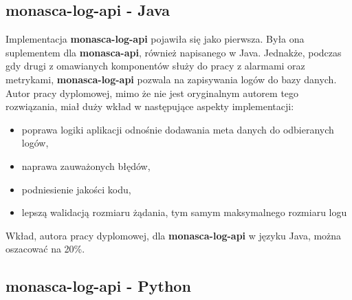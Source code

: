 \subsection{monasca-log-api - Java}
\label{chapter:application:own_work:monasca_log_api:java}
    Implementacja \textbf{monasca-log-api} pojawiła się jako pierwsza. Była ona suplementem dla \textbf{monasca-api}, również 
    napisanego w Java. Jednakże, podczas gdy drugi z omawianych komponentów służy do pracy z alarmami oraz metrykami, 
    \textbf{monasca-log-api} pozwala na zapisywania logów do bazy danych. Autor pracy dyplomowej, mimo że nie jest 
    oryginalnym autorem tego rozwiązania, miał duży wkład w następujące aspekty implementacji:
    \begin{itemize}
        \item poprawa logiki aplikacji odnośnie dodawania meta danych do odbieranych logów,
        \item naprawa zauważonych błędów,
        \item podniesienie jakości kodu,
        \item lepszą walidacją rozmiaru żądania, tym samym maksymalnego rozmiaru logu
    \end{itemize}
    
    Wkład, autora pracy dyplomowej, dla \textbf{monasca-log-api} w języku Java, można oszacować na 20\%.

\subsection{monasca-log-api - Python}
\label{chapter:application:own_work:monasca_log_api:python}

